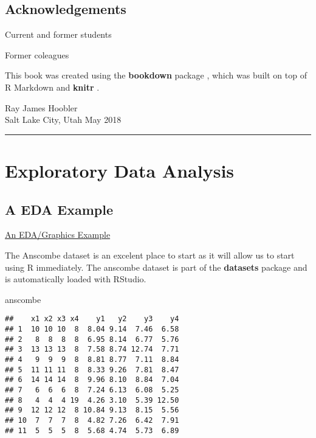 \documentclass[]{book}
\newenvironment{Shaded}{\begin{snugshade}}{\end{snugshade}}
\newcommand{\NormalTok}[1]{#1}
\theoremstyle{definition}
\theoremstyle{definition}
\theoremstyle{definition}
\theoremstyle{remark}
\begin{document}
\hypertarget{acknowledgements}{%
\section*{Acknowledgements}\label{acknowledgements}}

Current and former students

Former coleagues

This book was created using the \textbf{bookdown} package
\citep{R-bookdown}, which was built on top of R Markdown and
\textbf{knitr} \citep{xie2015}.

Ray James Hoobler\\
Salt Lake City, Utah May 2018

\begin{center}\rule{0.5\linewidth}{\linethickness}\end{center}

\hypertarget{EDA}{%
\chapter{Exploratory Data Analysis}\label{EDA}}

\hypertarget{a-eda-example}{%
\section{A EDA Example}\label{a-eda-example}}

\href{https://www.itl.nist.gov/div898/handbook/eda/section1/eda16.htm}{An
EDA/Graphics Example}

The Anscombe dataset is an excelent place to start as it will allow us
to start using R immediately. The anscombe dataset is part of the
\textbf{datasets} package and is automatically loaded with RStudio.

\begin{Shaded}
\begin{Highlighting}[]
\NormalTok{anscombe}
\end{Highlighting}
\end{Shaded}

\begin{verbatim}
##    x1 x2 x3 x4    y1   y2    y3    y4
## 1  10 10 10  8  8.04 9.14  7.46  6.58
## 2   8  8  8  8  6.95 8.14  6.77  5.76
## 3  13 13 13  8  7.58 8.74 12.74  7.71
## 4   9  9  9  8  8.81 8.77  7.11  8.84
## 5  11 11 11  8  8.33 9.26  7.81  8.47
## 6  14 14 14  8  9.96 8.10  8.84  7.04
## 7   6  6  6  8  7.24 6.13  6.08  5.25
## 8   4  4  4 19  4.26 3.10  5.39 12.50
## 9  12 12 12  8 10.84 9.13  8.15  5.56
## 10  7  7  7  8  4.82 7.26  6.42  7.91
## 11  5  5  5  8  5.68 4.74  5.73  6.89
\end{verbatim}
\end{document}
